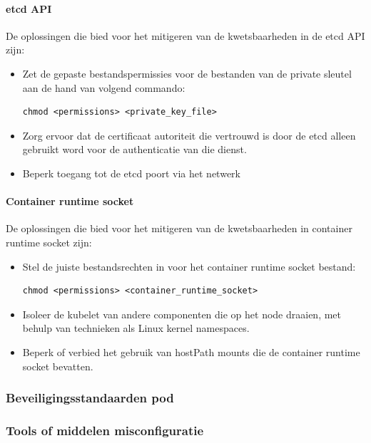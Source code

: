 \paragraph{etcd API}
De oplossingen die \textcite{KubernetesDocs-2023} bied voor het mitigeren van de kwetsbaarheden in de etcd API zijn:
\begin{itemize}
    \item Zet de gepaste bestandspermissies voor de bestanden van de private sleutel aan de hand van volgend commando:
\begin{lstlisting}[language=tex, caption={Opzetten gepaste bestandspermissies voor private sleutel}]
chmod <permissions> <private_key_file>
\end{lstlisting}
    \item Zorg ervoor dat de certificaat autoriteit die vertrouwd is door de etcd alleen gebruikt word voor de authenticatie van die dienst. 
    \item Beperk toegang tot de etcd poort via het netwerk
\end{itemize}

\paragraph{Container runtime socket}
De oplossingen die \textcite{KubernetesDocs-2023} bied voor het mitigeren van de kwetsbaarheden in container runtime socket zijn:
\begin{itemize}
    \item Stel de juiste bestandsrechten in voor het container runtime socket bestand:
\begin{lstlisting}[language=tex, caption={Opzetten juiste bestandsrechten voor container runtime socket}]
chmod <permissions> <container_runtime_socket>
\end{lstlisting}
    \item Isoleer de kubelet van andere componenten die op het node draaien, met behulp van technieken als Linux kernel namespaces.
    \item Beperk of verbied het gebruik van hostPath mounts die de container runtime socket bevatten.
\end{itemize}

\subsubsection{Beveiligingsstandaarden pod}


\subsubsection{Tools of middelen misconfiguratie}


